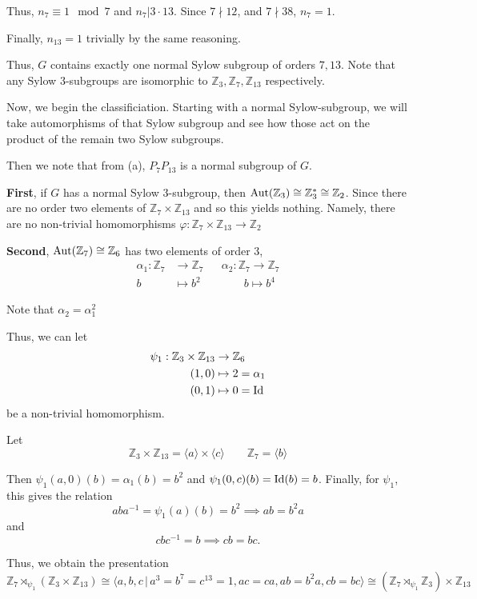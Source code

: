 \documentclass[12pt]{AlgebraQual}
\begin{document}
\begin{solution}
\begin{enumerate}[label=(\alph*)]
    Thus, $n_7\equiv 1\mod 7$ and $n_7|3\cdot 13$. Since $7\nmid12$, and $7\nmid38$, $n_7=1$.

    Finally, $n_{13}=1$ trivially by the same reasoning.

    Thus, $G$ contains exactly one normal Sylow subgroup of orders $7,13$. Note that any Sylow $3$-subgroups are isomorphic to $\mathbb{Z}_3,\mathbb{Z}_7,\mathbb{Z}_{13}$ respectively.

    Now, we begin the classificiation. Starting with a normal Sylow-subgroup, we will take automorphisms of that Sylow subgroup and see how those act on the product of the remain two Sylow subgroups.

    Then we note that from (a), $P_7P_{13}$ is a normal subgroup of $G.$

    \textbf{First}, if $G$ has a normal Sylow $3$-subgroup, then $\text{Aut}(\mathbb{Z}_3)\cong\mathbb{Z}_3^*\cong\mathbb{Z}_2$. Since there are no order two elements of $\mathbb{Z}_7\times\mathbb{Z}_{13}$ and so this yields nothing. Namely, there are no non-trivial homomorphisms $\varphi:\mathbb{Z}_7\times\mathbb{Z}_{13}\to\mathbb{Z}_2$

    \textbf{Second}, $\text{Aut}(\mathbb{Z}_7)\cong\mathbb{Z}_6$ has two elements of order $3$, \begin{align*}
        \alpha_1:\mathbb{Z}_7&\to\mathbb{Z}_7 &&\alpha_2:\mathbb{Z}_7\to\mathbb{Z}_7\\
        b&\mapsto b^2 &&\qquad b\mapsto b^4
    \end{align*}

    Note that $\alpha_2=\alpha_1^2$


    Thus, we can let \begin{align*}
        \psi_1:\mathbb{Z}_3\times\mathbb{Z}_{13}&\to\mathbb{Z}_6\\
        (1,0)&\mapsto 2=\alpha_1\\
        (0,1)&\mapsto 0=\text{Id}
    \end{align*} be a non-trivial homomorphism.

    Let $$\mathbb{Z}_3\times\mathbb{Z}_{13}=\langle a\rangle\times\langle c\rangle\qquad\mathbb{Z}_7=\langle b\rangle$$

    Then $\psi_1(a,0)(b)=\alpha_1(b)=b^2$ and $\psi_1(0,c)(b)=\text{Id}(b)=b$. Finally, for $\psi_1$, this gives the relation
    $$aba^{-1}=\psi_1(a)(b)=b^2\implies ab=b^2a$$ and $$cbc^{-1}=b\implies cb=bc.$$

    Thus, we obtain the presentation $$\mathbb{Z}_7\rtimes_{\psi_1}(\mathbb{Z}_3\times\mathbb{Z}_{13})\cong\langle a,b,c\,|\, a^3=b^7=c^{13}=1, ac=ca, ab=b^2a, cb=bc\rangle\cong (\mathbb{Z}_7\rtimes_{\psi_1}\mathbb{Z}_3)\times\mathbb{Z}_{13}$$


\end{enumerate}
\end{solution}
\end{document}
